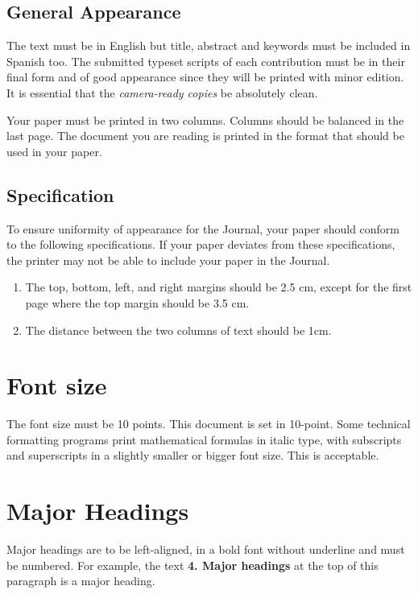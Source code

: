 \documentclass{jcst}
\begin{document}
\subsection{General Appearance}

The text must be in English but title, abstract and keywords must be included in Spanish too. The submitted typeset scripts of each contribution must be in their final form and of good appearance since they will be printed with minor edition. It is essential that the \textit{camera-ready copies} be absolutely clean.

Your paper must be printed in two columns. Columns should be balanced in the last page. The document you are reading is printed in the format that should be used in your paper.

\subsection{Specification}

To ensure uniformity of appearance for the Journal, your paper should conform to
 the following specifications. If your paper deviates from these
 specifications, the printer may not be able to include your paper in the Journal.

\begin{enumerate}
\item The top, bottom, left, and right margins should be 2.5 cm, except for the first page where the top margin should be 3.5 cm.
\item The distance between the two columns of text should be 1cm.
\end{enumerate}

\section{Font size}
The font size must be 10 points. This document is set in 10-point. Some technical
formatting programs print mathematical formulas in italic type, with subscripts
and superscripts in a slightly smaller or bigger font size. This is acceptable.

\section{Major Headings}

Major headings are to be left-aligned, in a bold font without underline and
must be numbered. For example, the text
 \textbf{4. Major headings} at the top of this paragraph is a major heading.
\end{document}
